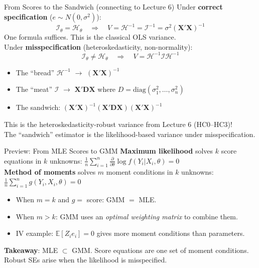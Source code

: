 \documentclass[aspectratio=169, handout, t]{beamer}
\numberwithin{equation}{section}
\begin{document}
\begin{frame}{From Scores to the Sandwich (connecting to Lecture 6)}
Under \textbf{correct specification} ($e\sim N(0,\sigma^2)$):
$$\mathcal{I}_\theta=\mathcal{H}_\theta \quad\Longrightarrow\quad V=\mathcal{H}^{-1}=\mathcal{I}^{-1}=\sigma^2(\bm{X'X})^{-1}$$
One formula suffices.  This is the classical OLS variance.\\\pause
\medskip
Under \textbf{misspecification} (heteroskedasticity, non-normality):
$$\mathcal{I}_\theta\neq\mathcal{H}_\theta \quad\Longrightarrow\quad V=\mathcal{H}^{-1}\mathcal{I}\mathcal{H}^{-1}$$\pause
\begin{itemize}
\item The ``bread'' $\mathcal{H}^{-1}$ $\to$ $(\bm{X'X})^{-1}$
\item The ``meat'' $\mathcal{I}$ $\to$ $\bm{X'DX}$ where $D=\text{diag}(\sigma_1^2,\ldots,\sigma_n^2)$
\item The sandwich: $(\bm{X'X})^{-1}(\bm{X'DX})(\bm{X'X})^{-1}$
\end{itemize}\pause
This is the \alert{heteroskedasticity-robust variance} from Lecture 6 (HC0--HC3)!\\
The ``sandwich'' estimator is the likelihood-based variance under misspecification.
\end{frame}

\begin{frame}{Preview: From MLE Scores to GMM}
\textbf{Maximum likelihood} solves $k$ score equations in $k$ unknowns:
$\frac{1}{n}\sum_{i=1}^n \frac{\partial}{\partial \theta}\log f(Y_i|X_i,\theta)=0$\pause\\[4pt]
\textbf{Method of moments} solves $m$ moment conditions in $k$ unknowns:
$\frac{1}{n}\sum_{i=1}^n g(Y_i, X_i, \theta)=0$\pause
\begin{itemize}\setlength{\itemsep}{2pt}
\item When $m=k$ and $g=$ score: \alert{GMM $=$ MLE}.\pause
\item When $m>k$: GMM uses an \emph{optimal weighting matrix} to combine them.
\item IV example: $\mathbb{E}[Z_i e_i]=0$ gives more moment conditions than parameters.\pause
\end{itemize}
\smallskip
\textbf{Takeaway}: MLE $\subset$ GMM.  Score equations are one set of moment conditions.  Robust SEs arise when the likelihood is misspecified.
\end{frame}
\end{document}
